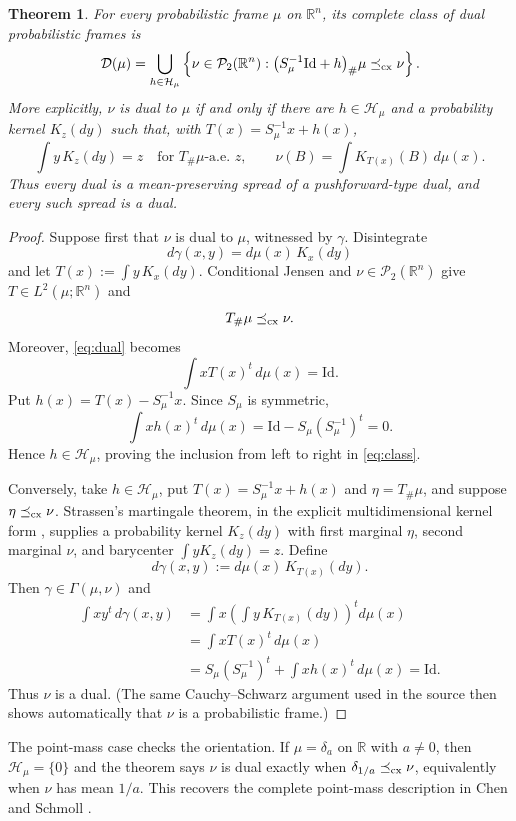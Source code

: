\documentclass[11pt]{article}
\newtheorem{theorem}{Theorem}
\newcommand{\R}{\mathbb{R}}
\newcommand{\Ptwo}{\mathcal P_2(\R^n)}
\newcommand{\Id}{\mathrm{Id}}
\begin{document}
\begin{theorem}\label{thm:classification}
For every probabilistic frame $\mu$ on $\R^n$, its complete class of dual
probabilistic frames is
\begin{equation}\label{eq:class}
 \mathcal D(\mu)=
 \bigcup_{h\in\mathcal H_\mu}
 \left\{\nu\in\Ptwo:
   \big(S_\mu^{-1}\Id+h\big)_\#\mu\preceq_{\rm cx}\nu\right\}.
\end{equation}
More explicitly, $\nu$ is dual to $\mu$ if and only if there are
$h\in\mathcal H_\mu$ and a probability kernel $K_z(dy)$ such that, with
$T(x)=S_\mu^{-1}x+h(x)$,
\[
 \int y\,K_z(dy)=z
 \quad\text{for }T_\#\mu\text{-a.e. }z,
 \qquad
 \nu(B)=\int K_{T(x)}(B)\,d\mu(x).
\]
Thus every dual is a mean-preserving spread of a pushforward-type dual, and
every such spread is a dual.
\end{theorem}

\begin{proof}
Suppose first that $\nu$ is dual to $\mu$, witnessed by $\gamma$. Disintegrate
\[
 d\gamma(x,y)=d\mu(x)\,K_x(dy)
\]
and let $T(x):=\int y\,K_x(dy)$. Conditional Jensen and $\nu\in\Ptwo$ give
$T\in L^2(\mu;\R^n)$ and
\[
 T_\#\mu\preceq_{\rm cx}\nu.
\]
Moreover, \eqref{eq:dual} becomes
\[
 \int xT(x)^t\,d\mu(x)=\Id.
\]
Put $h(x)=T(x)-S_\mu^{-1}x$. Since $S_\mu$ is symmetric,
\[
 \int xh(x)^t\,d\mu(x)
 =\Id-S_\mu(S_\mu^{-1})^t=0.
\]
Hence $h\in\mathcal H_\mu$, proving the inclusion from left to right in
\eqref{eq:class}.

Conversely, take $h\in\mathcal H_\mu$, put
$T(x)=S_\mu^{-1}x+h(x)$ and $\eta=T_\#\mu$, and suppose
$\eta\preceq_{\rm cx}\nu$. Strassen's martingale theorem, in the explicit
multidimensional kernel form \cite[Theorem~2.3]{BB}, supplies a probability
kernel $K_z(dy)$ with first
marginal $\eta$, second marginal $\nu$, and barycenter
$\int yK_z(dy)=z$. Define
\[
 d\gamma(x,y):=d\mu(x)\,K_{T(x)}(dy).
\]
Then $\gamma\in\Gamma(\mu,\nu)$ and
\begin{align*}
 \int xy^t\,d\gamma(x,y)
 &=\int x\left(\int y\,K_{T(x)}(dy)\right)^t d\mu(x)\\
 &=\int xT(x)^t\,d\mu(x)\\
 &=S_\mu(S_\mu^{-1})^t+
   \int xh(x)^t\,d\mu(x)=\Id.
\end{align*}
Thus $\nu$ is a dual. (The same Cauchy--Schwarz argument used in the source
then shows automatically that $\nu$ is a probabilistic frame.)
\end{proof}

The point-mass case checks the orientation. If $\mu=\delta_a$ on $\R$ with
$a\ne0$, then $\mathcal H_\mu=\{0\}$ and the theorem says
$\nu$ is dual exactly when $\delta_{1/a}\preceq_{\rm cx}\nu$, equivalently
when $\nu$ has mean $1/a$. This recovers the complete point-mass description
in Chen and Schmoll \cite[Proposition~5.12]{CS}.
\end{document}
